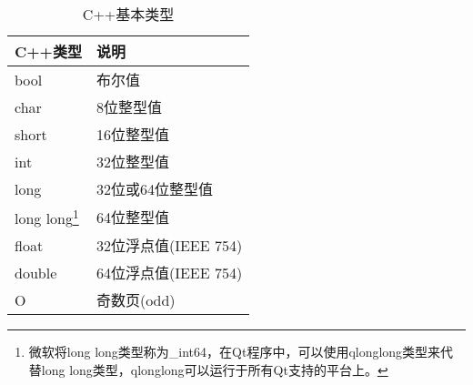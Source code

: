 \documentclass[11pt,oneside]{book}
\begin{document}
\begin{common-format}
\begin{minipage}{0.9\linewidth}
\begin{table}[H]
\centering
\caption{C++基本类型}
\label{tab:C++基本类型}
\medskip 
\begin{tabular}{@{}ll@{}}
\toprule
C++类型 & 说明  \\ \midrule
bool  &  布尔值 \\
char  &  8位整型值 \\
short  &  16位整型值 \\
int  &  32位整型值 \\
long  &  32位或64位整型值 \\
long long\footnote{微软将long long类型称为\_{}int64，在Qt程序中，可以使用qlonglong类型来代替long long类型，qlonglong可以运行于所有Qt支持的平台上。}  &  64位整型值 \\
float  &  32位浮点值(IEEE 754) \\
double  &  64位浮点值(IEEE 754) \\
O  & 奇数页(odd)
 \\ \bottomrule
\end{tabular}
\end{table}
\end{minipage}










\end{common-format}
\end{document}
